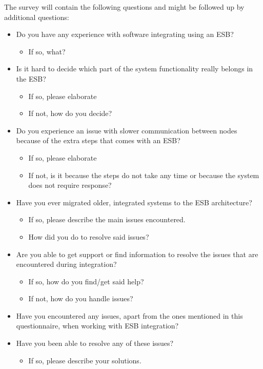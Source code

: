 \documentclass{llncs}
\begin{document}
The survey will contain the following questions and might be followed up by additional questions:
\label{survey}
\begin{itemize}

\item Do you have any experience with software integrating using an ESB?
\begin{itemize}
\item If so, what?
\end{itemize}

\item Is it hard to decide which part of the system functionality really belongs in the ESB?
\begin{itemize}
\item If so, please elaborate
\item If not, how do you decide?
\end{itemize}

\item Do you experience an issue with slower communication between nodes because of the extra steps that comes with an ESB?
\begin{itemize}
\item If so, please elaborate
\item If not, is it because the steps do not take any time or because the system does not require response?
\end{itemize}

\item Have you ever migrated older, integrated systems to the ESB architecture?
\begin{itemize}
\item If so, please describe the main issues encountered.
\item How did you do to resolve said issues?
\end{itemize}

\item Are you able to get support or find information to resolve the issues that are encountered during integration?
\begin{itemize}
\item If so, how do you find/get said help?
\item If not, how do you handle issues?
\end{itemize}

\item Have you encountered any issues, apart from the ones mentioned in this questionnaire, when working with ESB integration?

\item Have you been able to resolve any of these issues?
\begin{itemize}
\item If so, please describe your solutions.
\end{itemize}

\end{itemize}
\end{document}
